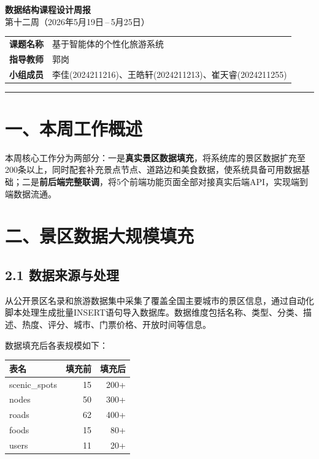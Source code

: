 \documentclass[12pt,a4paper]{article}
\begin{document}
\begin{center}
    {\LARGE\bfseries\color{headblue} 数据结构课程设计周报}\\[6pt]
    {\Large 第十二周（2026年5月19日\,--\,5月25日）}\\[12pt]
    \begin{tabular}{ll}
        \bfseries 课题名称 & 基于智能体的个性化旅游系统 \\
        \bfseries 指导教师 & 郭岗 \\
        \bfseries 小组成员 & 李佳(2024211216)、王皓轩(2024211213)、崔天睿(2024211255) \\
    \end{tabular}
\end{center}

\rule{\textwidth}{0.8pt}

\section*{一、本周工作概述}

本周核心工作分为两部分：一是\textbf{真实景区数据填充}，将系统库的景区数据扩充至200条以上，同时配套补充景点节点、道路边和美食数据，使系统具备可用数据基础；二是\textbf{前后端完整联调}，将5个前端功能页面全部对接真实后端API，实现端到端数据流通。

\section*{二、景区数据大规模填充}

\subsection*{2.1 数据来源与处理}

从公开景区名录和旅游数据集中采集了覆盖全国主要城市的景区信息，通过自动化脚本处理生成批量INSERT语句导入数据库。数据维度包括名称、类型、分类、描述、热度、评分、城市、门票价格、开放时间等信息。

数据填充后各表规模如下：

\begin{center}
\begin{tabular}{l r r}
    \toprule
    \bfseries 表名 & \bfseries 填充前 & \bfseries 填充后 \\
    \midrule
    scenic\_spots & 15 & 200+ \\
    nodes & 50 & 300+ \\
    roads & 62 & 400+ \\
    foods & 15 & 80+ \\
    users & 11 & 20+ \\
    \bottomrule
\end{tabular}
\end{center}
\end{document}
